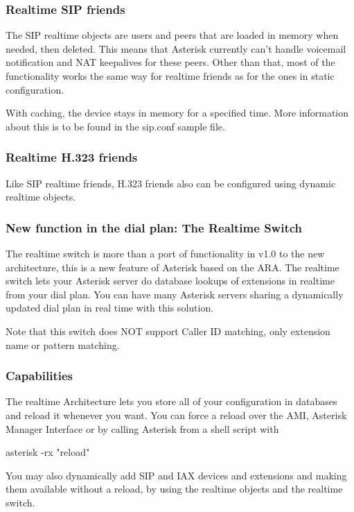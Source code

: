 \subsubsection{Realtime SIP friends}

The SIP realtime objects are users and peers that are loaded in memory
when needed, then deleted. This means that Asterisk currently can't handle
voicemail notification and NAT keepalives for these peers. Other than that,
most of the functionality works the same way for realtime friends as for
the ones in static configuration.

With caching, the device stays in memory for a specified time. More
information about this is to be found in the sip.conf sample file.

\subsubsection{Realtime H.323 friends}

Like SIP realtime friends, H.323 friends also can be configured using
dynamic realtime objects.

\subsubsection{New function in the dial plan: The Realtime Switch}

The realtime switch is more than a port of functionality in v1.0 to the
new architecture, this is a new feature of Asterisk based on the
ARA. The realtime switch lets your Asterisk server do database lookups
of extensions in realtime from your dial plan. You can have many Asterisk
servers sharing a dynamically updated dial plan in real time with this
solution.

Note that this switch does NOT support Caller ID matching, only
extension name or pattern matching.

\subsubsection{Capabilities}

The realtime Architecture lets you store all of your configuration in
databases and reload it whenever you want. You can force a reload over
the AMI, Asterisk Manager Interface or by calling Asterisk from a
shell script with

  asterisk -rx "reload"

You may also dynamically add SIP and IAX devices and extensions
and making them available without a reload, by using the realtime
objects and the realtime switch.

